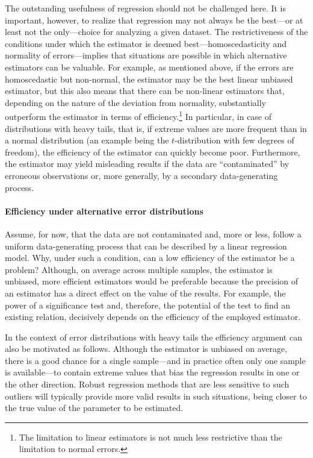 The outstanding usefulness of  regression should not be challenged
here. It is important, however, to realize that  regression may not
always be the best---or at least not the only---choice for analyzing a given
dataset. The restrictiveness of the conditions under which the 
estimator is deemed best---homoscedasticity and normality of errors---implies
that situations are possible in which alternative estimators can be valuable.
For example, as mentioned above, if the errors are homoscedastic but
non-normal, the  estimator may be the best linear unbiased estimator,
but this also means that there can be non-linear estimators that, depending on
the nature of the deviation from normality, substantially outperform the
 estimator in terms of efficiency.\footnote{The limitation to linear
estimators is not much less restrictive than the limitation to normal errors.}
In particular, in case of distributions with heavy tails, that is, if extreme
values are more frequent than in a normal distribution (an example being the
$t$-distribution with few degrees of freedom), the efficiency of the 
estimator can quickly become poor. Furthermore, the  estimator may
yield misleading results if the data are “contaminated” by erroneous
observations or, more generally, by a secondary data-generating process.

\paragraph{Efficiency under alternative error distributions}

Assume, for now, that the data are not contaminated and, more or less, follow a
uniform data-generating process that can be described by a linear regression
model. Why, under such a condition, can a low efficiency of the 
estimator be a problem? Although, on average across multiple samples, the
 estimator is unbiased, more efficient estimators would be preferable
because the precision of an estimator has a direct effect on the value of the
results. For example, the power of a significance test and, therefore, the
potential of the test to find an existing relation, decisively depends on the
efficiency of the employed estimator.

In the context of error distributions with heavy tails the efficiency argument
can also be motivated as follows. Although the  estimator is unbiased
on average, there is a good chance for a single sample---and in practice often
only one sample is available---to contain extreme values that bias the
regression results in one or the other direction. Robust regression methods
that are less sensitive to such outliers will typically provide more valid
results in such situations, being closer to the true value of the parameter to
be estimated.

